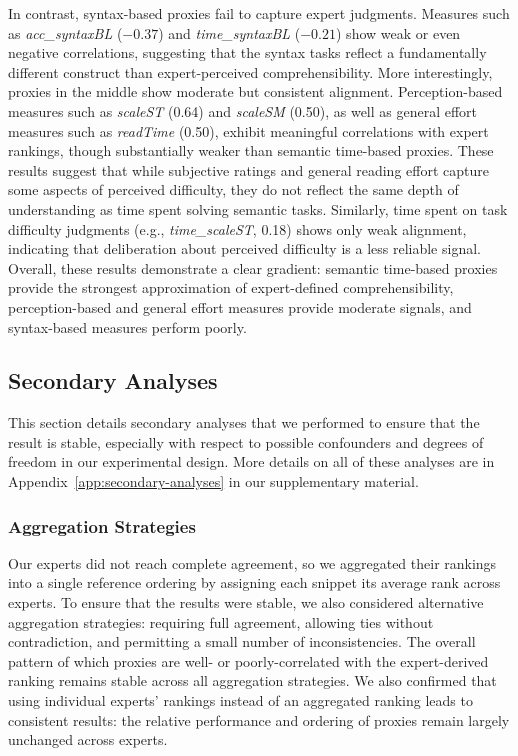 In contrast, syntax-based proxies fail to capture expert judgments. Measures such as \emph{acc\_syntaxBL} ($-0.37$) and \emph{time\_syntaxBL} ($-0.21$) show weak or even negative correlations, suggesting that the syntax tasks reflect a fundamentally different construct than expert-perceived comprehensibility.
More interestingly, proxies in the middle show moderate but consistent alignment. Perception-based measures such as \emph{scaleST} (0.64) and \emph{scaleSM} (0.50), as well as general effort measures such as \emph{readTime} (0.50), exhibit meaningful correlations with expert rankings, though substantially weaker than semantic time-based proxies. These results suggest that while subjective ratings and general reading effort capture some aspects of perceived difficulty, they do not reflect the same depth of understanding as time spent solving semantic tasks. Similarly, time spent on task difficulty judgments (e.g., \emph{time\_scaleST}, 0.18) shows only weak alignment, indicating that deliberation about perceived difficulty is a less reliable signal.
Overall, these results demonstrate a clear gradient: semantic time-based proxies provide the strongest approximation of expert-defined comprehensibility, perception-based and general effort measures provide moderate signals, and syntax-based measures perform poorly.








\subsection{Secondary Analyses}
\label{sec:secondary-analyses}

This section details secondary analyses that we performed to ensure that the result is stable, especially with respect to possible confounders and degrees of freedom in our experimental design. More details on all of these analyses are in Appendix~\ref{app:secondary-analyses} in our supplementary material.

\subsubsection{Aggregation Strategies}
\label{sec:aggregation_strategies}

Our experts did not reach complete agreement, so we aggregated their rankings into a single reference ordering by assigning each snippet its average rank across experts. To ensure that the results were stable, we also considered alternative aggregation strategies: requiring full agreement, allowing ties without contradiction, and permitting a small number of inconsistencies. The overall pattern of which proxies are well- or poorly-correlated with the expert-derived ranking remains stable across all aggregation strategies.
We also confirmed that using individual experts’ rankings instead of an aggregated ranking leads to consistent results: the relative performance and ordering of proxies remain largely unchanged across experts.



